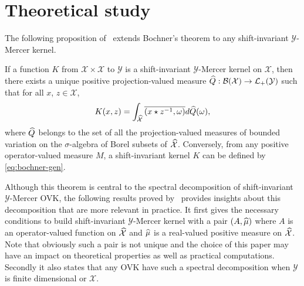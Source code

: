 \section{Theoretical study}
\label{sec:theoretical_study}
The following proposition of~\citet{Zhang2012,Carmeli2010} extends Bochner's
theorem to any shift-invariant $\mathcal{Y}$-Mercer kernel.
\begin{proposition}
    \label{pr:operator_valued_bochner}
    If a function $K$ from $\mathcal{X} \times \mathcal{X}$ to $\mathcal{Y}$ is
    a shift-invariant $\mathcal{Y}$-Mercer kernel on $\mathcal{X}$, then there
    exists a unique positive projection-valued measure $\widehat{Q}:
    \mathcal{B}(\mathcal{X}) \to
    \mathcal{L}_+(\mathcal{Y})$ such that for all $x$, $z \in \mathcal{X}$,
    \begin{dmath} 
        \label{eq:bochner-gen} 
        K(x, z) = \int_{\dual{\mathcal{X}}} \conj{\pairing{x \groupop \inv{z},
        \omega}} d\dual{Q}(\omega),
    \end{dmath}
    where $\widehat{Q}$ belongs to the set of all the projection-valued measures
    of bounded variation on the $\sigma$-algebra of Borel subsets of
    $\widehat{\mathcal{X}}$. Conversely, from any positive operator-valued measure
    $M$, a shift-invariant kernel $K$ can be defined by \cref{eq:bochner-gen}.
\end{proposition}
Although this theorem is central to the spectral decomposition of
shift-invariant $\mathcal{Y}$-Mercer \acs{OVK}, the following results proved
by~\citet{Carmeli2010} provides insights about this decomposition that are more
relevant in practice. It first gives the necessary conditions to build
shift-invariant $\mathcal{Y}$-Mercer kernel with a pair $(A, \widehat{\mu})$ where
$A$ is an operator-valued function on $\widehat{\mathcal{X}}$ and $\widehat{\mu}$ is
a real-valued positive measure on $\widehat{\mathcal{X}}$. Note that obviously
such a pair is not unique and the choice of this paper may have an impact on
theoretical properties as well as practical computations.  Secondly it also
states that any \acs{OVK} have such a spectral decomposition when $\mathcal{Y}$
is finite dimensional or $\mathcal{X}$.

